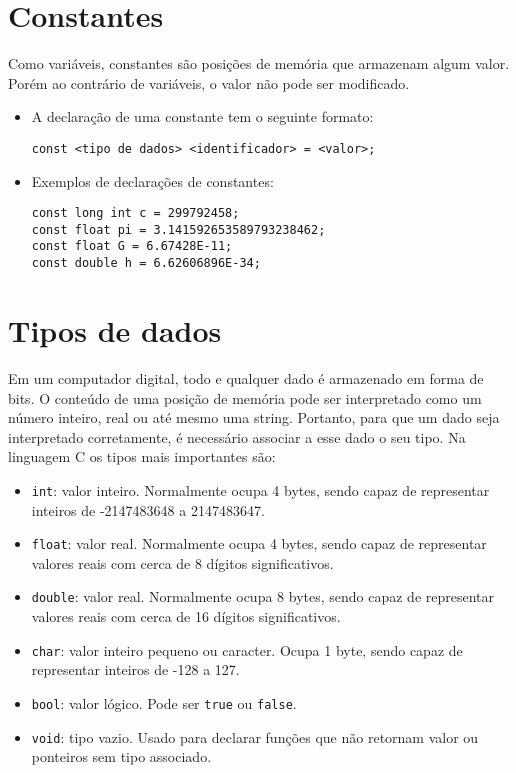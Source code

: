 
\section{Constantes}

Como variáveis, constantes são posições de memória que armazenam algum valor. Porém ao contrário de variáveis, o valor não pode ser modificado.

\begin{itemize}

\item A declaração de uma constante tem o seguinte formato:

{\tt const <tipo de dados> <identificador> = <valor>;}

\item Exemplos de declarações de constantes:
\begin{lstlisting}
const long int c = 299792458;
const float pi = 3.141592653589793238462;
const float G = 6.67428E-11;
const double h = 6.62606896E-34;
\end{lstlisting}

\end{itemize}



\section{Tipos de dados}

Em um computador digital, todo e qualquer dado é armazenado em forma de bits. O conteúdo de uma posição de memória pode ser interpretado como um número inteiro, real ou até mesmo uma string. Portanto, para que um dado seja interpretado corretamente, é necessário associar a esse dado o seu tipo. Na linguagem C os tipos mais importantes são:

\begin{itemize}
\item {\tt int}: valor inteiro. Normalmente ocupa 4 bytes, sendo capaz de representar inteiros de -2147483648 a 2147483647.
\item {\tt float}: valor real. Normalmente ocupa 4 bytes, sendo capaz de representar valores reais com cerca de 8 dígitos significativos.
\item {\tt double}: valor real. Normalmente ocupa 8 bytes, sendo capaz de representar valores reais com cerca de 16 dígitos significativos.
\item {\tt char}: valor inteiro pequeno ou caracter. Ocupa 1 byte, sendo capaz de representar inteiros de -128 a 127.
\item {\tt bool}: valor lógico. Pode ser {\tt true} ou {\tt false}.

\item {\tt void}: tipo vazio. Usado para declarar funções que não retornam valor ou ponteiros sem tipo associado.
\end{itemize}

